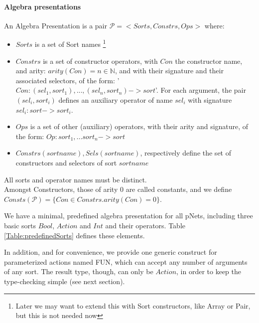 \documentclass{lncs/llncs}
\begin{document}
\paragraph{Algebra presentations}
\begin{definition}
  An Algebra Presentation is a pair $\mathcal{P}=<Sorts,Constrs,Ops>$ where:
  \begin{itemize}
  \item $Sorts$ is a set of Sort names
    \footnote{Later we may want to extend this with Sort constructors,
      like Array or Pair, but this is not needed now}
  \item $Constrs$ is a set of constructor operators, with $Con$ the
    constructor name, and arity: $arity(Con)=n \in \mathbb{N}$,
    and with their signature and their associated selectors,
    of the form: '$Con : (sel_1,sort_1), ... , (sel_n,sort_n) -> sort$'.
    For each argument, the pair $(sel_i,sort_i)$ defines an auxiliary
    operator of name $sel_i$ with signature $sel_i : sort -> sort_i$.
    \item $Ops$ is a set of other (auxiliary) operators, with their
      arity and signature, of the form: $Op : sort_1, ...  sort_n ->
      sort$
      \item $Constrs(sortname), Sels(sortname)$, respectively define the set of
        constructors and selectors of sort $sortname$
  \end{itemize}
  All sorts and operator names must be distinct.\\
  Amongst Constructors, those of arity 0 are called constants, and we
  define $Consts(\mathcal{P}) = \{Con \in Constrs. arity(Con)=0\}$.
\end{definition}


We have a minimal, predefined algebra presentation for all pNets, including
three basic sorts $Bool$, $Action$ and $Int$ and their
operators. Table \ref{Table:predefinedSorts} defines these elements.

In addition, and for convenience, we provide one generic construct for
parameterized actions named FUN, which can accept any number of
arguments of any sort. The result type, though, can only be $Action$,
in order to keep the type-checking simple (see next section).
\end{document}
